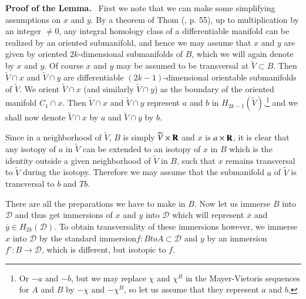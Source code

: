 \noindent
{\bf Proof of the Lemma.}~ First we note that we can make some simplifying assumptions on $x$ and $y$. By a theorem of Thom (\cite{art11-key9}, p. 55), up to multiplication by an integer $\neq 0$, any integral homology class of a differentiable manifold can be realized by an oriented submanifold, and hence we may assume that $x$ and $y$ are given by oriented $2k$-dimensional submanifolds of $B$, which we will again denote by $x$ and $y$. Of course $x$ and $y$ may be assumed to be transversal at $\widetilde{V}\subset B$. Then $\widetilde{V}\cap x$ and $\widetilde{V}\cap y$ are differentiable $(2k-1)$-dimensional orientable submanifolds of $\widetilde{V}$. We orient $\widetilde{V}\cap x$ (and similarly $\widetilde{V}\cap y$) as the boundary of the oriented manifold $C_{1}\cap x$. Then $\widetilde{V}\cap x$ and $\widetilde{V}\cap y$ represent $a$ and $b$ in $H_{2k-1}(\widetilde{V})$,\footnote{Or $-a$ and $-b$, but we may replace $\chi$ and $\chi^{B}$ in the Mayer-Vietoris sequences for $A$ and $B$ by $-\chi$ and $-\chi^{B}$, so let us assume that they represent $a$ and $b$.} and we shall now denote $\widetilde{V}\cap x$ by $a$ and $\widetilde{V}\cap y$ by $b$.

Since in a neighborhood of $\widetilde{V}$, $B$ is simply $\widetilde{V}\times \mathbf{R}$ and $x$ is $a\times \mathbf{R}$, it is clear that any isotopy of $a$ in $\widetilde{V}$ can be extended to an isotopy of $x$ in $B$ which is the identity outside a given neighborhood of $\widetilde{V}$ in $B$, such that $x$ remains transversal to $\widetilde{V}$ during the isotopy. Therefore we may assume that the submanifold $a$ of $\widetilde{V}$ is transversal to $b$ and $Tb$.

There are all the preparations we have to make in $B$. Now let us immerse $B$ into $\mathscr{D}$ and thus get immersions of $x$ and $y$ into $\mathscr{D}$ which will represent $\overline{x}$ and $\overline{y}\in H_{2k}(\mathscr{D})$. To obtain transversality of these immersions however, we immerse $x$ into $\mathscr{D}$ by the standard immersion\pageoriginale $f:Bto A\subset \mathscr{D}$ and $y$ by an immersion $f':B\to \mathscr{D}$, which is different, but isotopic to $f$.

